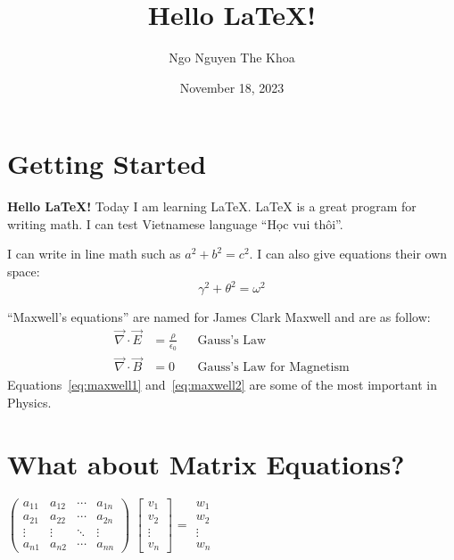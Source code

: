 \documentclass{article}
\title{Hello LaTeX!}
\author{Ngo Nguyen The Khoa}
\date{November 18, 2023}
\begin{document}
\maketitle

\section{Getting Started}
\textbf{Hello LaTeX!}
Today I am learning \LaTeX{}. \LaTeX{} is a great program for writing math. I can test Vietnamese language ``Học vui thôi''.

I can write in line math such as \(a^2 + b^2 = c^2\). I can also give equations their own space:
\begin{equation}
	\gamma^2 + \theta^2 = \omega^2
\end{equation}

``Maxwell's equations'' are named for James Clark Maxwell and are as follow:
\begin{align}
	\vec{\nabla} \cdot \vec{E} & = \frac{\rho}{\epsilon_0} &  & \text{Gauss's Law}\label{eq:maxwell1}               \\
	\vec{\nabla} \cdot \vec{B} & = 0                       &  & \text{Gauss's Law for Magnetism}\label{eq:maxwell2}
\end{align}
Equations~\ref{eq:maxwell1} and~\ref{eq:maxwell2} are some of the most important in Physics.

\section{What about Matrix Equations?}
\begin{center}
	\(\begin{pmatrix} a_{11} & a_{12} & \cdots & a_{1n} \\ a_{21} & a_{22} & \cdots & a_{2n} \\ \vdots & \vdots & \ddots & \vdots \\ a_{n1} & a_{n2} & \cdots & a_{nn} \end{pmatrix}\)
	\(\begin{bmatrix} v_1    \\ v_2    \\ \vdots \\ v_n \end{bmatrix}\)
	=
	\(\begin{matrix} w_1    \\ w_2    \\ \vdots \\ w_n \end{matrix}\)
\end{center}
\end{document}
